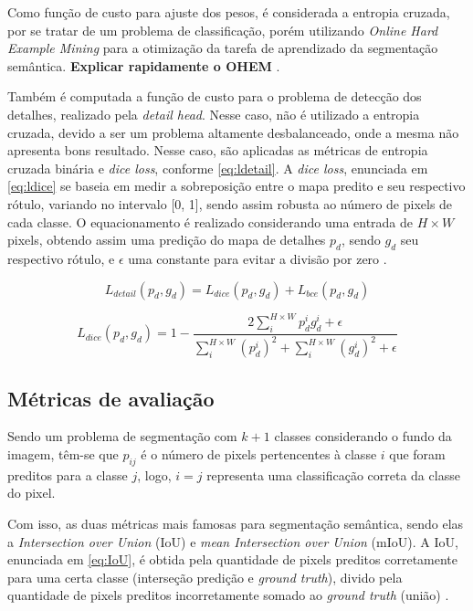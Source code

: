 \documentclass[conference]{IEEEtran}
\begin{document}
Como função de custo para ajuste dos pesos, é considerada a entropia cruzada, por se tratar de um problema de classificação, porém utilizando \textit{Online Hard Example Mining} para a otimização da tarefa de aprendizado da segmentação semântica. \textbf{Explicar rapidamente o OHEM} \cite{shrivastava2016TrainingRegionbasedObject}. 

Também é computada a função de custo para o problema de detecção dos detalhes, realizado pela \textit{detail head}. Nesse caso, não é utilizado a entropia cruzada, devido a ser um problema altamente desbalanceado, onde a mesma não apresenta bons resultado. Nesse caso, são aplicadas as métricas de entropia cruzada binária e \textit{dice loss}, conforme \eqref{eq:ldetail}. A \textit{dice loss}, enunciada em \eqref{eq:ldice} se baseia em medir a sobreposição entre o mapa predito e seu respectivo rótulo, variando no intervalo [0, 1], sendo assim robusta ao número de pixels de cada classe. O equacionamento é realizado considerando uma entrada de $H \times W$ pixels, obtendo assim uma predição do mapa de detalhes $p_d$, sendo $g_d$ seu respectivo rótulo, e $\epsilon$ uma constante para evitar a divisão por zero \cite{deng2018LearningPredictCrisp}.

\begin{equation}\label{eq:ldetail}
	L_{detail}(p_d,g_d) = L_{dice}(p_d, g_d) + L_{bce}(p_d, g_d)
\end{equation}

\begin{equation}\label{eq:ldice}
	L_{dice}(p_d, g_d) = 1 - \frac{2\sum_{i}^{H\times W}p_d^ig_d^i + \epsilon}{\sum_{i}^{H\times W}(p_d^i)^2 + \sum_{i}^{H\times W}(g_d^i)^2 + \epsilon}
\end{equation}


\subsection{Métricas de avaliação}

Sendo um problema de segmentação com $k +1$ classes considerando o fundo da imagem, têm-se que $p_{ij}$ é o número de pixels pertencentes à classe $i$ que foram preditos para a classe $j$, logo, $i = j$ representa uma classificação correta da classe do pixel.

Com isso, as duas métricas mais famosas para segmentação semântica, sendo elas a \textit{Intersection over Union} (IoU) e \textit{mean Intersection over Union} (mIoU). A IoU, enunciada em \eqref{eq:IoU}, é obtida pela quantidade de pixels preditos corretamente para uma certa classe (interseção predição e \textit{ground truth}), divido pela quantidade de pixels preditos incorretamente somado ao \textit{ground truth} (união) \cite{papadeas2021RealTimeSemanticImage}. 
\end{document}
